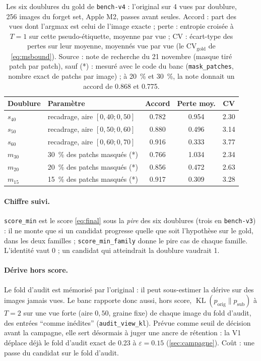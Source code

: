 \documentclass[11pt,a4paper]{article}
\newcommand{\KL}{\operatorname{KL}}
\newcommand{\orig}{\mathrm{orig}}
\newcommand{\gold}{\mathrm{gold}}
\newcommand{\sub}{\mathrm{sub}}
\newcommand{\code}[1]{\texttt{#1}}
\begin{document}
\begin{table}[ht]
  \centering\small
  \caption{Les six doublures du gold de \code{bench-v4} : l'original sur 4 vues par doublure,
  256 images du forget set, Apple M2, passes avant seules. Accord : part des vues dont l'argmax est
  celui de l'image exacte ; perte : entropie croisée à $T=1$ sur cette pseudo-étiquette, moyenne par
  vue ; CV : écart-type des pertes sur leur moyenne, moyennés vue par vue (le $\mathrm{CV}_\gold$
  de \eqref{eq:msbound}). Source : note de recherche du 21 novembre (masque tiré patch par patch),
  sauf (*) : mesuré avec le code du banc (\code{mask\_patches}, nombre exact de patchs par image) ;
  à \SI{20}{\percent} et \SI{30}{\percent}, la note donnait un accord de \num{0.868} et \num{0.775}.}\label{tab:familles}
  \begin{tabular}{@{}llSSS[table-format=1.2]@{}}
    \toprule
    Doublure & Paramètre & {Accord} & {Perte moy.} & {CV}\\
    \midrule
    $s_{40}$ & recadrage, aire $[0{,}40;0{,}50]$ & 0.782 & 0.954 & 2.30\\
    $s_{50}$ & recadrage, aire $[0{,}50;0{,}60]$ & 0.880 & 0.496 & 3.14\\
    $s_{60}$ & recadrage, aire $[0{,}60;0{,}70]$ & 0.916 & 0.333 & 3.77\\
    $m_{30}$ & \SI{30}{\percent} des patchs masqués (*) & 0.766 & 1.034 & 2.34\\
    $m_{20}$ & \SI{20}{\percent} des patchs masqués (*) & 0.856 & 0.472 & 2.63\\
    $m_{15}$ & \SI{15}{\percent} des patchs masqués (*) & 0.917 & 0.309 & 3.28\\
    \bottomrule
  \end{tabular}
\end{table}

\paragraph{Chiffre suivi.} \code{score\_min} est le score \eqref{eq:final} sous la \emph{pire} des
six doublures (trois en \code{bench-v3}) : il ne monte que si un candidat progresse quelle que soit l'hypothèse sur le gold,
dans les deux familles ; \code{score\_min\_family} donne le pire cas de chaque famille. L'identité
vaut 0 ; un candidat qui atteindrait la doublure vaudrait 1.

\paragraph{Dérive hors score.} Le fold d'audit est mémorisé par l'original : il peut sous-estimer la
dérive sur des images jamais vues. Le banc rapporte donc aussi, hors score, $\KL(p_\orig\|p_\sub)$ à
$T=2$ sur une vue forte (aire $0{,}50$, graine fixe) de chaque image du fold d'audit, des entrées
\enquote{comme inédites} (\code{audit\_view\_kl}). Prévue comme seuil de décision avant la campagne,
elle sert désormais à juger une ancre de rétention : la V1 déplace déjà le fold d'audit exact de
\num{0.23} à $\varepsilon=\num{0.15}$ (\cref{sec:campagne}). Coût : une passe du candidat sur le fold d'audit.
\end{document}
